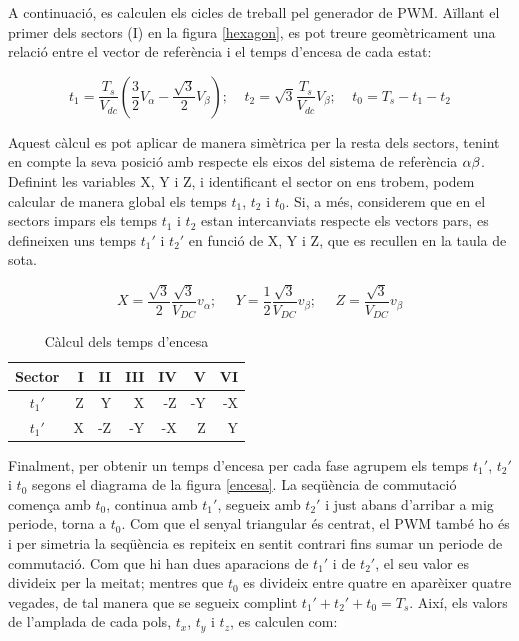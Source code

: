 {{        A continuació, es calculen els cicles de treball pel generador de PWM.
        Aïllant el primer dels sectors (I) en la figura \ref{hexagon}, es pot
        treure geomètricament una relació entre el vector de referència i el
        temps d'encesa de cada estat:

        \begin{equation}
            t_1 = \frac{T_s}{V_{dc}} (\frac{3}{2} V_\alpha-\frac{\sqrt{3}}{2} V_\beta);\ \ \ \ \ 
            t_2 = \sqrt{3} \frac{T_s}{V_{dc}} V_\beta;\ \ \ \ \ 
            t_0 = T_s - t_1 - t_2
        \end{equation}

        Aquest càlcul es pot aplicar de manera simètrica per la resta dels
        sectors, tenint en compte la seva posició amb respecte els eixos del
        sistema de referència $\alpha\-\beta$. Definint les variables X, Y i Z,
        i identificant el sector on ens trobem, podem calcular de manera global
        els temps $t_1$, $t_2$ i $t_0$. Si, a més, considerem que en el sectors
        impars els temps $t_1$ i $t_2$ estan intercanviats respecte els vectors
        pars, es defineixen uns temps $t_1'$ i $t_2'$ en funció de X, Y i Z,
        que es recullen en la taula de sota.

        \begin{equation}
            X = \frac{\sqrt{3}}{2}\frac{\sqrt{3}}{V_{DC}}v_\alpha;\ \ \ \ \ \
            Y = \frac{1}{2}\frac{\sqrt{3}}{V_{DC}}v_\beta;\ \ \ \ \ \
            Z = \frac{\sqrt{3}}{V_{DC}}v_\beta
        \end{equation}

        \begin{table}[!htb]
            \caption{Càlcul dels temps d'encesa}
            \centering
            
            \begin{tabular}{c r r r r r r}
                \toprule
                    {Sector} & I & II & III & IV & V & VI \\
                \midrule
                    $t_1'$ & Z & Y & X & -Z & -Y & -X \\
                    $t_1'$ & X & -Z & -Y & -X & Z & Y \\ 
                \bottomrule
            \end{tabular}
        \end{table}

        Finalment, per obtenir un temps d'encesa per cada fase agrupem els
        temps $t_1'$, $t_2'$ i $t_0$ segons el diagrama de la figura
        \ref{encesa}. La seqüència de commutació comença amb $t_0$, continua
        amb $t_1'$, segueix amb $t_2'$ i just abans d'arribar a mig periode,
        torna a $t_0$. Com que el senyal triangular és centrat, el PWM també ho
        és i per simetria la seqüència es repiteix en sentit contrari fins
        sumar un periode de commutació. Com que hi han dues aparacions de $t_1'$
        i de $t_2'$, el seu valor es divideix per la meitat; mentres que $t_0$
        es divideix entre quatre en aparèixer quatre vegades, de tal manera que
        se segueix complint $t_1' + t_2' + t_0 = T_s$. Així, els valors de
        l'amplada de cada pols, $t_x$, $t_y$ i $t_z$, es calculen com:

}}
